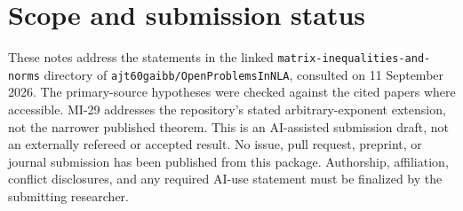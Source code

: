 \section*{Scope and submission status}
These notes address the statements in the linked \texttt{matrix-inequalities-and-norms} directory of \texttt{ajt60gaibb/OpenProblemsInNLA}, consulted on 11 September 2026. The primary-source hypotheses were checked against the cited papers where accessible. MI-29 addresses the repository's stated arbitrary-exponent extension, not the narrower published theorem. This is an AI-assisted submission draft, not an externally refereed or accepted result. No issue, pull request, preprint, or journal submission has been published from this package. Authorship, affiliation, conflict disclosures, and any required AI-use statement must be finalized by the submitting researcher.
\tableofcontents
\clearpage

\clearpage

\clearpage

\clearpage

\clearpage

\clearpage

\clearpage

\clearpage

\clearpage

\clearpage

\clearpage

\clearpage

\clearpage

\clearpage



